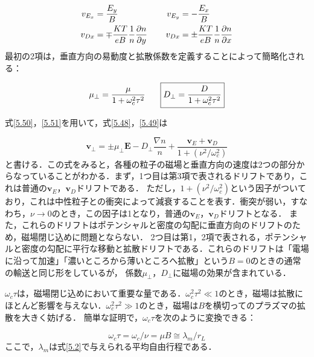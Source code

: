 \documentclass{ltjsarticle}
\numberwithin{equation}{section} %
\begin{document}
\begin{equation}
  \begin{aligned}
    v_{E_x} &= \frac{E_y}{B}                                                           & v_{E_y} &= -\frac{E_x}{B}\\
    v_{Dx}  &= \mp \frac{KT}{eB}\frac{1}{n}\frac{\partial n}{\partial y} \hspace{1pc}  & v_{Dx}  &= \pm \frac{KT}{eB}\frac{1}{n}\frac{\partial n}{\partial x} 
  \end{aligned} \label{5.50}
\end{equation}
最初の2項は，垂直方向の易動度と拡散係数を定義することによって簡略化される：

\begin{equation}
  \mu_\perp = \frac{\mu}{1 + \omega^2_c\tau^2} \hspace{1.5pc} \boxed{D_\perp = \frac{D}{1 + \omega^2_c\tau^2}} \label{5.51} 
\end{equation}

式\eqref{5.50}，\eqref{5.51}を用いて，式\eqref{5.48}，\eqref{5.49}は

\begin{equation}
  \bm{v}_\perp = \pm \mu_\perp \bm{E} - D_\perp \frac{\nabla n}{n} + \frac{\bm{v}_E + \bm{v}_D}{1 + (\nu^2/\omega^2_c)} \label{5.52}
\end{equation}
と書ける．この式をみると，各種の粒子の磁場と垂直方向の速度は2つの部分からなっていることがわかる．まず，1つ目は第3項で表されるドリフトであり，これは普通の$\bm{v}_E$，$\bm{v}_D$ドリフトである．
ただし，$1+(\nu^2/\omega^2_c)$という因子がついており，これは中性粒子との衝突によって減衰することを表す．衝突が弱い，すなわち，$\nu\to 0$のとき，この因子は1となり，普通の$\bm{v}_E$，$\bm{v}_D$ドリフトとなる．
また，これらのドリフトはポテンシャルと密度の勾配に垂直方向のドリフトのため，磁場閉じ込めに問題とならない．
2つ目は第1，2項で表される，ポテンシャルと密度の勾配に平行な移動と拡散ドリフトである．これらのドリフトは「電場に沿って加速」「濃いところから薄いところへ拡散」という$B=0$のときの通常の輸送と同じ形をしているが，
係数$\mu_\perp$，$D_\perp$に磁場の効果が含まれている．

$\omega_c\tau$は，磁場閉じ込めにおいて重要な量である．$\omega^2_c\tau^2\ll1$のとき，磁場は拡散にほとんど影響を与えない．$\omega^2_c\tau^2\gg 1$のとき，磁場は$B$を横切ってのプラズマの拡散を大きく妨げる．
簡単な証明で，$\omega_c\tau$を次のように変換できる：

\begin{equation}
  \omega_c\tau = \omega_c/\nu = \mu B \cong \lambda_m/r_L \label{5.53}
\end{equation}
ここで，$\lambda_m$は式\eqref{5.2}で与えられる平均自由行程である．
\end{document}
